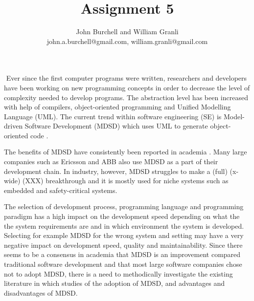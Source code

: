 \documentclass[10pt,twocolumn]{article}
\begin{document}
\title{Assignment 5}

\author{John Burchell and William Granli \\
john.a.burchell@gmail.com, william.granli@gmail.com}


\maketitle
\thispagestyle{empty}




​
Ever since the first computer programs were written, researchers and developers have been working on new programming concepts in order to decrease the level of complexity needed to develop programs. The abstraction level has been increased with help of compilers, object-oriented programming and Unified Modelling Language (UML). The current trend within software engineering (SE) is Model-driven Software Development (MDSD) which uses UML to generate object-oriented code \cite{staron2006adopting}. 

The benefits of MDSD have consistently been reported in academia \cite{staron2006adopting} \cite{volter2013model}. Many large companies such as Ericsson and ABB \cite{staron2006adopting} also use MDSD as a part of their development chain. In industry, however, MDSD struggles to make a (full) (x-wide) (XXX) breakthrough and it is mostly used for niche systems such as embedded and safety-critical systems.


The selection of development process, programming language and programming paradigm has a high impact on the development speed depending on what the the system requirements are and in which environment the system is developed. Selecting for example MDSD for the wrong system and setting may have a very negative impact on development speed, quality and maintainability. Since there seems to be a consensus in academia that MDSD is an improvement compared traditional software development \cite{staron2006adopting} \cite{volter2013model} and that most large software companies chose not to adopt MDSD, there is a need to methodically investigate the existing literature in which studies of the adoption of MDSD, and advantages and disadvantages of MDSD. 

\end{document}

